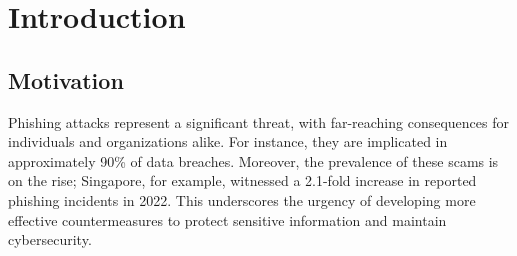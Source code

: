 








\tableofcontents
{}
\pagebreak

\section{Introduction}
\subsection{Motivation}
Phishing attacks represent a significant threat, with far-reaching consequences for individuals and organizations alike. For instance, they are implicated in approximately 90\% of data breaches. Moreover, the prevalence of these scams is on the rise; Singapore, for example, witnessed a 2.1-fold increase in reported phishing incidents in 2022. This underscores the urgency of developing more effective countermeasures to protect sensitive information and maintain cybersecurity.

